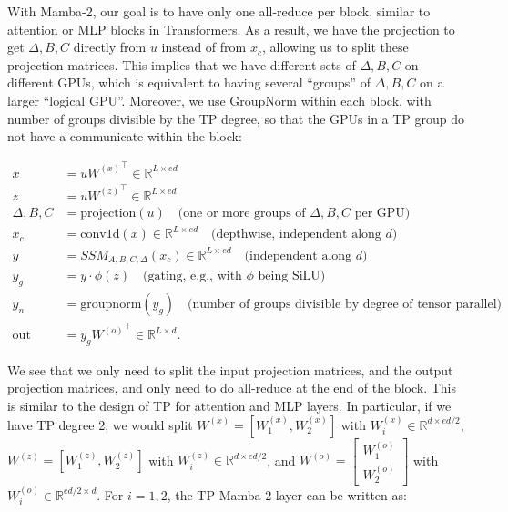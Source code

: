 With Mamba-2, our goal is to have only one all-reduce per block, similar to attention or MLP blocks in Transformers. As a result, we have the projection to get $\Delta, B, C$ directly from $u$ instead of from $x_c$, allowing us to split these projection matrices. This implies that we have different sets of $\Delta, B, C$ on different GPUs, which is equivalent to having several ``groups'' of $\Delta, B, C$ on a larger ``logical GPU''. Moreover, we use GroupNorm within each block, with number of groups divisible by the TP degree, so that the GPUs in a TP group do not have a communicate within the block:

\begin{align*}
   x &= u {W^{(x)}}^\top \in \mathbb{R}^{L \times ed} \\
   z &= u {W^{(z)}}^\top \in \mathbb{R}^{L \times ed} \\
   \Delta, B, C &= \text{projection}(u) \quad \text{(one or more groups of $\Delta, B, C$ per GPU)} \\
   x_c &= \mathrm{conv1d}(x) \in \mathbb{R}^{L \times ed} \quad \text{(depthwise, independent along $d$)} \\
   y &= SSM_{A, B, C, \Delta}(x_c) \in \mathbb{R}^{L \times ed} \quad \text{(independent along $d$)} \\
   y_g &= y \cdot \phi(z)  \quad \text{(gating, e.g., with $\phi$ being SiLU)} \\
   y_n &= \mathrm{groupnorm}(y_g) \quad \text{(number of groups divisible by degree of tensor parallel)} \\
   \mathrm{out} &= y_g {W^{(o)}}^\top \in \mathbb{R}^{L \times d}.
\end{align*}

We see that we only need to split the input projection matrices, and the output projection matrices, and only need to do all-reduce at the end of the block. This is similar to the design of TP for attention and MLP layers. In particular, if we have TP degree 2, we would split $W^{(x)} = [W^{(x)}_1, W^{(x)}_2]$ with $W^{(x)}_i \in \mathbb{R}^{d \times ed/2}$, $W^{(z)} = [W^{(z)}_1, W^{(z)}_2]$ with $W^{(z)}_i \in \mathbb{R}^{d \times ed/2}$, and $W^{(o)} =

\begin{bmatrix} W^{(o)}_1 \\ W^{(o)}_2 \end{bmatrix}

$ with $W^{(o)}_i \in \mathbb{R}^{ed/2 \times d}$. For $i = 1, 2$, the TP Mamba-2 layer can be written as:

